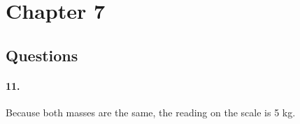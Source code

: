 


\renewcommand\assignment{HW 5, Due Friday, 3/3/2023 23:59; \S7 Q: \#11 P: \#42, 45 \S8 P: \#13, 22 ,26, 30, 51, 56}
\setlength{\belowdisplayskip}{0pt} \setlength{\belowdisplayshortskip}{0pt}
\setlength{\abovedisplayskip}{0pt} \setlength{\abovedisplayshortskip}{0pt}



    \iffalse
    \begin{equation*}
        \begin{gathered}
            Equations go here.
        \end{gathered}
    \end{equation*}

    \resizebox{\hsize}{!}{$Long equation goes here$}

    \begin{multicol*}{# of columns}
    \end{multicol*}

    \horizontal

    \fi


    \section*{Chapter 7}

    \subsection*{Questions}

    \paragraph*{11.}\mbox{}

    Because both masses are the same, the reading on the scale is 5 kg.

